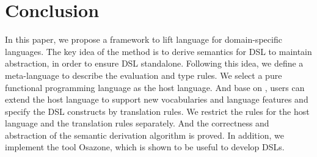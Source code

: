 \section{Conclusion}

In this paper, we propose a framework to lift language for domain-specific languages.
The key idea of the method is to derive semantics for DSL to maintain abstraction,
 in order to ensure DSL standalone.
Following this idea, we define a meta-language to describe the evaluation and type rules.
We select a pure functional programming language \STLC{} as the host language.
And base on \STLC, users can extend the host language to support new vocabularies and language features
 and specify the DSL constructs by translation rules.
We restrict the rules for the host language and the translation rules separately.
And the correctness and abstraction of the semantic derivation algorithm is proved.
In addition, we implement the tool Osazone,
 which is shown to be useful to develop DSLs.

 